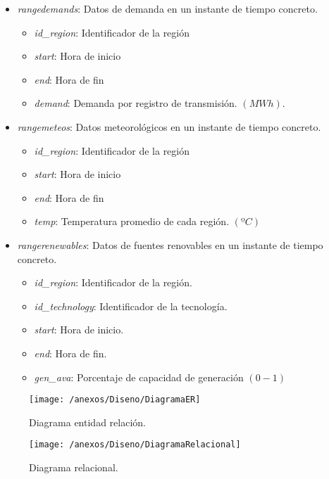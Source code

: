 \begin{itemize}
	\item \textit{rangedemands}: Datos de demanda en un instante de tiempo concreto.
	\begin{itemize}
		\item \textit{id\_region}: Identificador de la región
		\item \textit{start}: Hora de inicio
		\item \textit{end}: Hora de fin
		\item \textit{demand}: Demanda por registro de transmisión. $ (MWh) $.
	\end{itemize}
	
	\item \textit{rangemeteos}: Datos meteorológicos en un instante de tiempo concreto.
	\begin{itemize}
		\item \textit{id\_region}: Identificador de la región
		\item \textit{start}: Hora de inicio
		\item \textit{end}: Hora de fin
		\item \textit{temp}: Temperatura promedio de cada región. $ (ºC) $
	\end{itemize}
	
	\item \textit{rangerenewables}: Datos de fuentes renovables en un instante de tiempo concreto.
	\begin{itemize}
		\item \textit{id\_region}: Identificador de la región.
		\item \textit{id\_technology}: Identificador de la tecnología.
		\item \textit{start}: Hora de inicio.
		\item \textit{end}: Hora de fin.
		\item \textit{gen\_ava}: Porcentaje de capacidad de generación $ (0 - 1) $
	\end{itemize}

\end{itemize}

\begin{figure}[h]
	\centering
	\texttt{[image: /anexos/Diseno/DiagramaER]}
	\caption{Diagrama entidad relación.}
	\label{img:modeloER}
\end{figure}

\begin{figure}[h]
	\centering
	\texttt{[image: /anexos/Diseno/DiagramaRelacional]}
	\caption{Diagrama relacional.}
	\label{img:modeloRelacional}
\end{figure}

